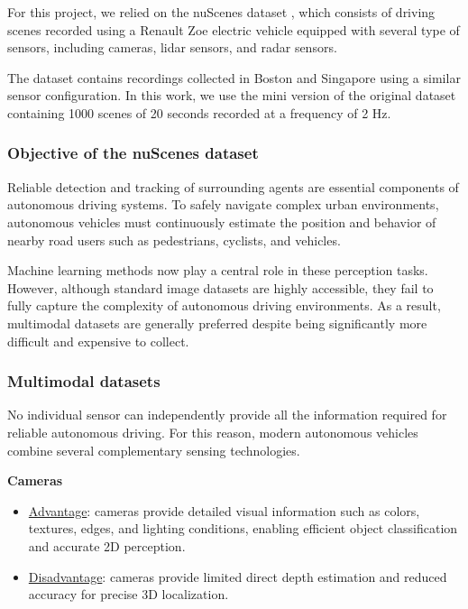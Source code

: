 \documentclass[conference]{IEEEtran}
\begin{document}
For this project, we relied on the nuScenes dataset \cite{nuscenes}, which consists of driving scenes recorded using a Renault Zoe electric vehicle equipped with several type of sensors, including cameras, lidar sensors, and radar sensors.
\

The dataset contains recordings collected in Boston and Singapore using a similar sensor configuration. In this work, we use the mini version of the original dataset containing 1000 scenes of 20 seconds recorded at a frequency of 2 Hz.

\subsubsection{Objective of the nuScenes dataset}

Reliable detection and tracking of surrounding agents are essential components of autonomous driving systems. To safely navigate complex urban environments, autonomous vehicles must continuously estimate the position and behavior of nearby road users such as pedestrians, cyclists, and vehicles.
\

Machine learning methods now play a central role in these perception tasks. However, although standard image datasets are highly accessible, they fail to fully capture the complexity of autonomous driving environments. As a result, multimodal datasets are generally preferred despite being significantly more difficult and expensive to collect.
\\

\subsubsection{Multimodal datasets}

No individual sensor can independently provide all the information required for reliable autonomous driving. For this reason, modern autonomous vehicles combine several complementary sensing technologies.
\

\textbf{Cameras}
\begin{itemize}
\item \underline{Advantage}: cameras provide detailed visual information such as colors, textures, edges, and lighting conditions, enabling efficient object classification and accurate 2D perception.

\item \underline{Disadvantage}: cameras provide limited direct depth estimation and reduced accuracy for precise 3D localization.

\end{itemize}
\
\end{document}
